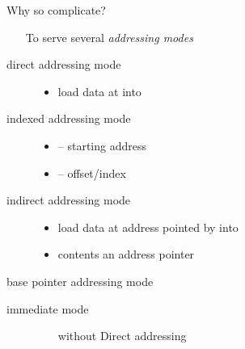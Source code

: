 \begin{frame}
  \begin{block}{Why so complicate?}
    \begin{itemize}
    \item[] To serve several \emph{addressing modes}
    \end{itemize}
    \begin{description}
    \item[direct addressing mode] 
      \begin{itemize}
      \item {\scriptsize{load data at  into }}
      \end{itemize}
    \item[indexed addressing mode] 
      \begin{itemize}
      \item {\scriptsize{ -- starting address}}
      \item {\scriptsize{ -- offset/index}}
      \end{itemize}
    \item[indirect addressing mode] 
      \begin{itemize}
      \item \scriptsize{load data at address pointed by  into }
      \item \scriptsize{ contents an address pointer}
      \end{itemize}
    \item[base pointer addressing mode] 
    \end{description}
  \end{block}
  \begin{description}
  \item[immediate mode] 
    \begin{scriptsize}
      \begin{itemize}
      \item[without \code{\$}] Direct addressing
      \end{itemize}
    \end{scriptsize}
  \end{description}
\end{frame}

